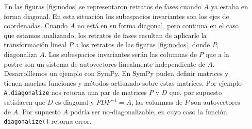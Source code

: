 En las figuras \ref{fig:nodos} se representaron retratos de fases cuando $A$ ya estaba en forma diagonal. En esta situación los subespacios invariantes son los ejes de coordenadas. Cuando $A$ no está en su forma diagonal, pero continua en el caso que estamos analizando, los retratos de fases resultan de aplicarle la transformación lineal $P$ a los retratos de  las figuras \ref{fig:nodos}, donde $P$, diagonaliza $A$.   Los subespacios invariantes serán las columnas de $P$ que a la postre son un sistema de autovectores linealmente independiente de $A$. Desarrolllemos un ejemplo con SymPy. En SymPy puden definir matrices y tienen muchas funciones y métodos actiuando sobre estas matrices. Por ejemplo \texttt{A.diagonalize} nos retorna una par de matrices $P$ y $D$ que, por supuesto satisfacen que $D$ es diagonal y $PDP^{-1}=A$, las columnas de $P$ son autovectores de $A$. Por supuesto $A$ podría ser no-diagonalizable, en cuyo caso la función \texttt{diagonalize()} retorna error. 

